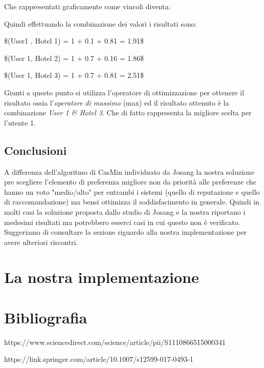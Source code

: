 \documentclass{report}
\begin{document}
	Che rappresentati graficamente come vincoli diventa:
	
	
	Quindi effettuando la combinazione dei valori i risultati sono:
	
	\$(User1 , Hotel 1) = 1 + 0.1 + 0.81 = 1.91\$
	
	\$(User 1, Hotel 2) = 1 + 0.7 + 0.16 = 1.86\$
	
	\$(User 1, Hotel 3) = 1 + 0.7 + 0.81 = 2.51\$
	
	Giunti a questo punto si utilizza l'operatore di ottimizzazione per
	ottenere il risultato ossia l'\emph{operatore di massimo} (max) ed il
	risultato ottenuto è la combinazione \emph{User 1 \& Hotel 3}. Che di
	fatto rappresenta la migliore scelta per l'utente 1.
	
	\hypertarget{header-n280}{%
		\subsection{Conclusioni}\label{header-n280}}
	
	A differenza dell'algoritmo di CasMin individuato da Josang la nostra
	soluzione pre scegliere l'elemento di preferenza migliore non da
	priorità alle preferenze che hanno un voto "medio/alto" per entrambi i
	sistemi (quello di reputazione e quello di raccomandazione) ma bensi
	ottimizza il soddisfacimento in generale. Quindi in molti casi la
	soluzione proposta dallo studio di Josang e la nostra riportano i
	medesimi risultati ma potrebbero esserci casi in cui questo non è
	verificato. Suggeriamo di consultare la sezione riguardo alla nostra
	implementazione per avere ulteriori riscontri.
	
	\hypertarget{header-n284}{%
		\section{La nostra implementazione}\label{header-n284}}
	
	\hypertarget{header-n287}{%
		\section{Bibliografia}\label{header-n287}}
	
	https://www.sciencedirect.com/science/article/pii/S1110866515000341
	
	https://link.springer.com/article/10.1007/s12599-017-0493-1
	
\end{document}
